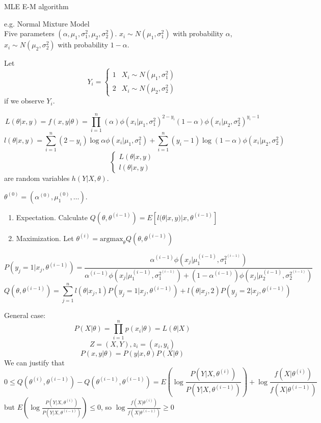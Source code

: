 \documentclass[11pt]{article}
\newcommand{\argmax}{\mathrm{argmax}}
\begin{document}
MLE  E-M algorithm

e.g. Normal Mixture Model
\\
Five parameters $(\alpha, \mu_1, \sigma_1^2, \mu_2, \sigma_2^2)$.
$x_i \sim N(\mu_1, \sigma_1^2)$ with probability $\alpha$,
$x_i \sim N(\mu_2, \sigma_2^2)$ with probability $1-\alpha$.

Let
$$
Y_i = \left\{\begin{array}{ll}
1 & X_i \sim N(\mu_1, \sigma_1^2)
\\
2 & X_i \sim N(\mu_2, \sigma_2^2)
\end{array}\right.
$$
if we observe $Y_i$.

$$
L(\theta | x, y) = f(x, y | \theta) =
\prod_{i=1}^{n} (\alpha)\phi(x_i | \mu_1, \sigma_1^2)^{2-y_i}
(1-\alpha)\phi(x_i | \mu_2, \sigma_2^2)^{y_i-1}
$$
$$
l(\theta | x, y) = \sum_{i=1}^{n} (2-y_i)\log \alpha \phi(x_i | \mu_1, \sigma_1^2) + \sum_{i=1}^{n} (y_i-1) \log (1-\alpha) \phi(x_i | \mu_2, \sigma_2^2)
$$
$$
\left\{\begin{array}{ll}
L(\theta | x, y)
\\
l(\theta | x, y)
\end{array}\right.
$$
are random variables $h(Y | X, \theta)$.

$\theta^{(0)} = (\alpha^{(0)}, \mu_1^{(0)}, \dots)$.
\begin{enumerate}
\item Expectation.
Calculate
$
Q(\theta, \theta^{(i-1)}) =
E[ l(\theta | x, y) | x, \theta^{(i-1)} ]
$
\item Maximization.
Let
$
\theta^{(i)} = \argmax_{\theta} Q(\theta, \theta^{(i-1)})
$
\end{enumerate}
$$
P(y_j=1 | x_j, \theta^{(i-1)}) =
\frac{
\alpha^{(i-1)} \phi(x_j | \mu_1^{(i-1)}, \sigma_1^{2^{(i-1)}})
}
{
\alpha^{(i-1)} \phi(x_j | \mu_1^{(i-1)}, \sigma_1^{2^{(i-1)}})
+
(1-\alpha^{(i-1)}) \phi(x_j | \mu_2^{(i-1)}, \sigma_2^{2^{(i-1)}})
}
$$
$$
Q(\theta, \theta^{(i-1)}) =
\sum_{j=1}^{n}
l(\theta | x_j, 1) P(y_j=1 | x_j, \theta^{(i-1)})
+
l(\theta | x_j, 2) P(y_j=2 | x_j, \theta^{(i-1)})
$$

General case:
$$
P(X | \theta) = \prod_{i=1}^{n} p(x_i | \theta) = L(\theta | X)
$$
$$
Z = (X, Y), z_i = (x_i, y_i)
$$
$$
P(x, y | \theta) = P(y | x, \theta) P(X | \theta)
$$
We can justify that
$$
0 \leq
Q(\theta^{(i)}, \theta^{(i-1)}) -
Q(\theta^{(i-1)}, \theta^{(i-1)})
=
E\left(
\log\frac{
P(Y | X, \theta^{(i)})
} {
P(Y | X, \theta^{(i-1)})
}
\right)
+ \log \frac{
f(X | \theta^{(i)})
}{
f(X | \theta^{(i-1)})
}
$$
but
$
E\left(
\log\frac{
P(Y | X, \theta^{(i)})
} {
P(Y | X, \theta^{(i-1)})
}
\right)
\leq 0
$,
so 
$
\log \frac{
f(X | \theta^{(i)})
}{
f(X | \theta^{(i-1)})
}
\geq 0
$
\end{document}

